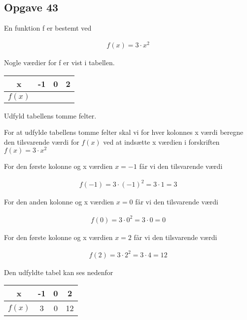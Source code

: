 \subsection{Opgave 43}

En funktion f er bestemt ved 

\begin{align*}
    f(x) = 3\cdot x^2
\end{align*}

Nogle værdier for f er vist i tabellen.

\begin{tabular}{|c|c|c|c|}
    \hline
    x & -1 & 0 & 2 \\\hline
    $f(x)$ &  &  & \\\hline
\end{tabular}

Udfyld tabellens tomme felter.

\ans

For at udfylde tabellens tomme felter skal vi for hver kolonnes x værdi beregne den tilsvarende værdi for $f(x)$ ved at indsætte x værdien i forskriften 
$f(x) = 3\cdot x^2$

For den første kolonne og x værdien $x = -1$ får vi den tilsvarende værdi

\begin{align*}
    f(-1) = 3\cdot (-1)^2 = 3 \cdot 1 = 3
\end{align*}

For den anden kolonne og x værdien $x = 0$ får vi den tilsvarende værdi

\begin{align*}
    f(0) = 3\cdot 0^2 = 3 \cdot 0 = 0
\end{align*}

For den første kolonne og x værdien $x = 2$ får vi den tilsvarende værdi

\begin{align*}
    f(2) = 3\cdot 2^2 = 3 \cdot 4 = 12
\end{align*}

Den udfyldte tabel kan ses nedenfor

\begin{tabular}{|c|c|c|c|}
    \hline
    x & -1 & 0 & 2 \\\hline
    $f(x)$ & 3 & 0 & 12 \\\hline
\end{tabular}

